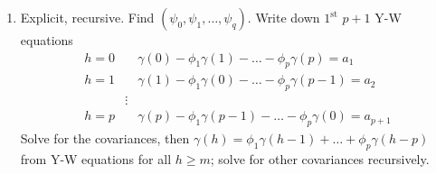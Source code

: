 \documentclass[paper=a4,fontsize=2.89mm]{scrartcl}
\begin{document}
\begin{multicols}{3}
\begin{enumerate}
\item Explicit, recursive.  Find $(\psi_0, \psi_1, \dots, \psi_q)$. Write down $1^\text{st}$ $p+1$ Y-W equations 
\begin{align*}
h = 0 &\quad \gamma(0) - \phi_1\gamma(1) - \dots - \phi_p\gamma(p) = a_1 \\
h = 1 &\quad \gamma(1) - \phi_1\gamma(0) - \dots - \phi_p\gamma(p-1) = a_2 \\
~& \vdots \\
h = p &\quad \gamma(p) - \phi_1\gamma(p-1) - \dots - \phi_p\gamma(0) = a_{p+1}
\end{align*}
Solve for the covariances, then $\gamma(h) = \phi_1\gamma(h-1) + \dots + \phi_p\gamma(h-p)$ from Y-W equations for all $h \ge m$; solve for other covariances recursively.

\end{enumerate}


\end{multicols}
\end{document}

